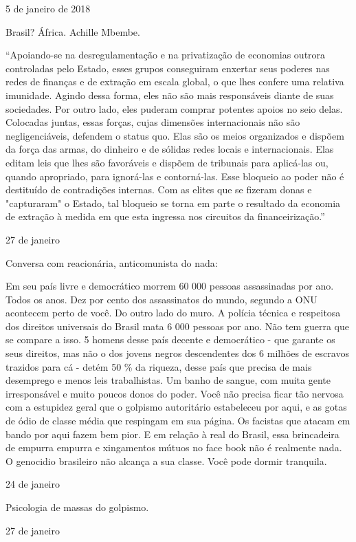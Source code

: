 5 de janeiro de 2018

Brasil? África. Achille Mbembe.

``Apoiando-se na desregulamentação e na privatização de economias
outrora controladas pelo Estado, esses grupos conseguiram enxertar seus
poderes nas redes de finanças e de extração em escala global, o que lhes
confere uma relativa imunidade. Agindo dessa forma, eles não são mais
responsáveis diante de suas sociedades. Por outro lado, eles puderam
comprar potentes apoios no seio delas. Colocadas juntas, essas forças,
cujas dimensões internacionais não são negligenciáveis, defendem o
status quo. Elas são os meios organizados e dispõem da força das armas,
do dinheiro e de sólidas redes locais e internacionais. Elas editam leis
que lhes são favoráveis e dispõem de tribunais para aplicá-las ou,
quando apropriado, para ignorá-las e contorná-las. Esse bloqueio ao
poder não é destituído de contradições internas. Com as elites que se
fizeram donas e "capturaram" o Estado, tal bloqueio se torna em parte o
resultado da economia de extração à medida em que esta ingressa nos
circuitos da financeirização.''

27 de janeiro

Conversa com reacionária, anticomunista do nada:

Em seu país livre e democrático morrem 60 000 pessoas assassinadas por
ano. Todos os anos. Dez por cento dos assassinatos do mundo, segundo a
ONU acontecem perto de você. Do outro lado do muro. A polícia técnica e
respeitosa dos direitos universais do Brasil mata 6 000 pessoas por ano.
Não tem guerra que se compare a isso. 5 homens desse país decente e
democrático - que garante os seus direitos, mas não o dos jovens negros
descendentes dos 6 milhões de escravos trazidos para cá - detém 50 \% da
riqueza, desse país que precisa de mais desemprego e menos leis
trabalhistas. Um banho de sangue, com muita gente irresponsável e muito
poucos donos do poder. Você não precisa ficar tão nervosa com a
estupidez geral que o golpismo autoritário estabeleceu por aqui, e as
gotas de ódio de classe média que respingam em sua página. Os facistas
que atacam em bando por aqui fazem bem pior. E em relação à real do
Brasil, essa brincadeira de empurra empurra e xingamentos mútuos no face
book não é realmente nada. O genocidio brasileiro não alcança a sua
classe. Você pode dormir tranquila.

24 de janeiro

Psicologia de massas do golpismo.

27 de janeiro

